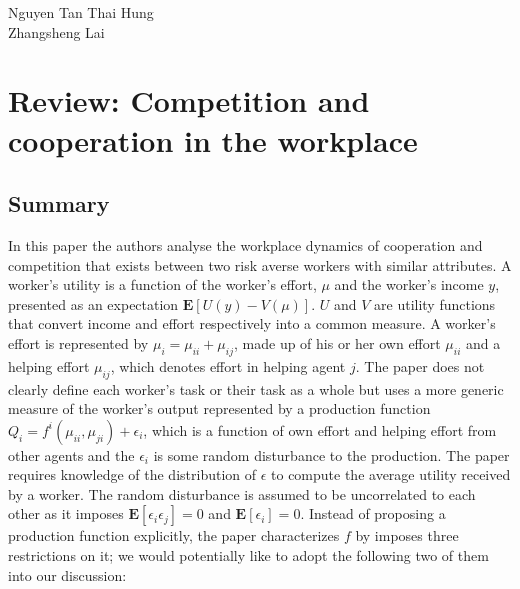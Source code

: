 \documentclass[a4paper,10pt,leqno]{article}
\theoremstyle{definition}
\begin{document}
\begin{flushright}
Nguyen Tan Thai Hung\\
Zhangsheng Lai\\
\end{flushright}
\section*{Review: Competition and cooperation in the
workplace}
\subsection*{Summary}

In this paper the authors analyse the workplace dynamics of cooperation and competition that exists between two risk averse workers with similar attributes. A worker's utility is a function of the worker's effort, $\mu$ and the worker's income $y$, presented as an expectation $\mathbf{E}[U(y)-V(\mu)]$.
$U$ and $V$ are utility functions that convert income and effort respectively into a common measure. A worker's effort is represented by $\mu_i = \mu_{ii}+\mu_{ij}$, made up of his or her own effort $\mu_{ii}$ and a helping effort $\mu_{ij}$, which denotes effort in helping agent $j$. The paper does not clearly define each worker's task or their task as a whole but uses a more generic measure of the worker's output represented by a production function $Q_i=f^i(\mu_{ii},\mu_{ji})+\epsilon_i$,
which is a function of own effort and helping effort from other agents and the $\epsilon_i$ is some random disturbance to the production. The paper requires knowledge of the distribution of $\epsilon$ to compute the average utility received by a worker. The random disturbance is assumed to be uncorrelated to each other as it imposes $\mathbf{E}[\epsilon_i\epsilon_j]=0$ and $\mathbf{E}[\epsilon_i]=0$. Instead of proposing a production function explicitly, the paper characterizes $f$ by imposes three restrictions on it; we would potentially like to adopt the following two of them into our discussion: 


\end{document}

